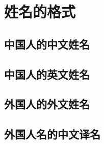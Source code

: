 
\section{姓名的格式}\label{sec:names}

\subsection{中国人的中文姓名}

\subsection{中国人的英文姓名}

\subsection{外国人的外文姓名}

\subsection{外国人名的中文译名}


